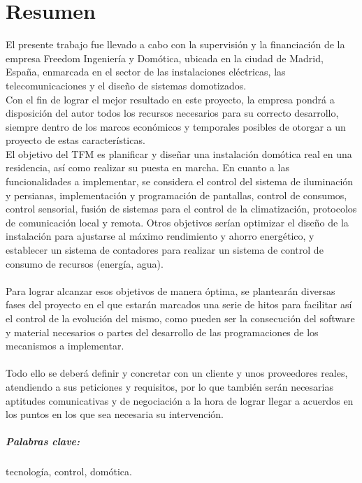 
\chapter{Resumen}

El presente trabajo fue llevado a cabo con la supervisión y la financiación de la empresa Freedom Ingeniería y Domótica, ubicada en la ciudad de Madrid, España, enmarcada en el sector de las instalaciones eléctricas, las telecomunicaciones y el diseño de sistemas domotizados. \\
Con el fin de lograr el mejor resultado en este proyecto, la empresa pondrá a disposición del autor todos los recursos necesarios para su correcto desarrollo, siempre dentro de los marcos económicos y temporales posibles de otorgar a un proyecto de estas características.\\
 El objetivo del TFM es planificar y diseñar una instalación domótica real en una residencia, así como realizar su puesta en marcha. En cuanto a las funcionalidades a implementar, se considera el control del sistema de iluminación y persianas, implementación y programación de pantallas, control de consumos, control sensorial, fusión de sistemas para el control de la climatización, protocolos de comunicación local y remota. Otros objetivos serían optimizar el diseño de la instalación para ajustarse al máximo rendimiento y ahorro energético, y establecer un sistema de contadores para realizar un sistema de control de consumo de recursos (energía, agua). \\\\
Para lograr alcanzar esos objetivos de manera óptima, se plantearán diversas fases del proyecto en el que estarán marcados una serie de hitos para facilitar así el control de la evolución del mismo, como pueden ser la consecución del software y material necesarios o partes del desarrollo de las programaciones de los mecanismos a implementar.\\\\
Todo ello se deberá definir y concretar con un cliente y unos proveedores reales, atendiendo a sus peticiones y requisitos, por lo que también serán necesarias aptitudes comunicativas y de negociación a la hora de lograr llegar a acuerdos en los puntos en los que sea necesaria su intervención.

\paragraph{Palabras clave:} tecnología, control, domótica.


